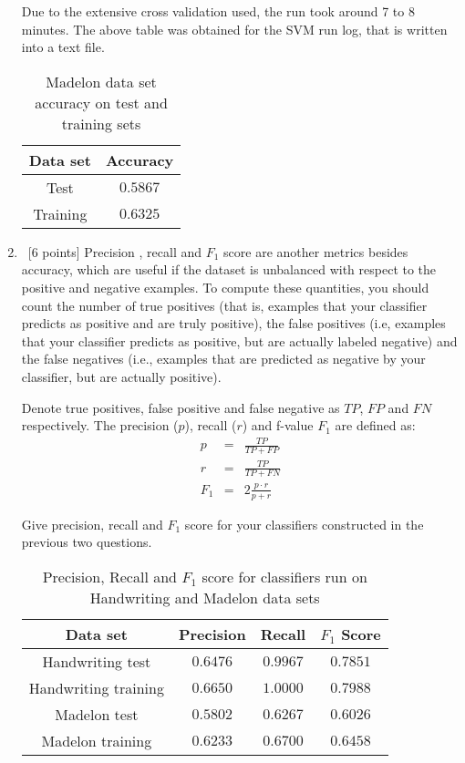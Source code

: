 \begin{enumerate}
Due to the extensive cross validation used, the run took around 7 to 8 minutes. The above table was obtained for the SVM run log, that is written into a text file.
    \begin{table}[H]
    \centering
    \begin{tabular}{| c | c |}
      \hline
      Data set & Accuracy  \\
      \hline
      Test & $0.5867$\\
      \hline
      Training & $0.6325$\\
      \hline
    \end{tabular}
    \caption{Madelon data set accuracy on test and training sets}
  \end{table}   

\item ~[6 points] Precision , recall and $ F_1$ score are another
  metrics besides accuracy, which are useful if the dataset is
  unbalanced with respect to the positive and negative examples. To
  compute these quantities, you should count the number of true
  positives (that is, examples that your classifier predicts as
  positive and are truly positive), the false positives (i.e, examples
  that your classifier predicts as positive, but are actually labeled
  negative) and the false negatives (i.e., examples that are predicted
  as negative by your classifier, but are actually positive).
  
  Denote true positives, false positive and false negative as $TP$, $FP$
  and $FN$ respectively. The precision ($p$), recall ($r$) and f-value
  $F_1$ are defined as:
  \begin{eqnarray*}
    p   & = & \frac{TP}{TP + FP} \\
    r   & = & \frac{TP}{TP+FN}   \\
    F_1 & = & 2 \frac{p \cdot r}{p + r} 
  \end{eqnarray*}

  Give precision, recall and $F_1$ score for your classifiers
  constructed in the previous two questions.

    \begin{table}[H]
    \centering
    \begin{tabular}{| c | c | c | c |}
      \hline
      Data set & Precision & Recall & $F_1$ Score  \\
      \hline
      Handwriting test& $0.6476$& $0.9967$& $0.7851$\\
      \hline
      Handwriting training& $0.6650$& $1.0000$& $0.7988$\\
      \hline
      Madelon test& $0.5802$& $0.6267$& $0.6026$\\
      \hline
      Madelon training& $0.6233$& $0.6700$& $0.6458$\\
      \hline
    \end{tabular}
    \caption{Precision, Recall and $F_1$ score for classifiers run on Handwriting and Madelon data sets}
  \end{table}   
\end{enumerate}

